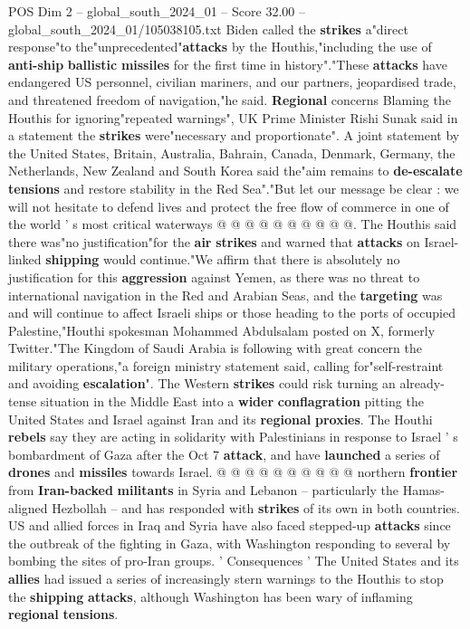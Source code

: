 \begin{textsample}{POS Dim 2 – global\_south\_2024\_01 – Score 32.00 – global\_south\_2024\_01/105038105.txt}
Biden called the \textbf{strikes} a"direct response"to the"unprecedented"\textbf{attacks} by the Houthis,"including the use of \textbf{anti-ship} \textbf{ballistic} \textbf{missiles} for the first time in history"."These \textbf{attacks} have endangered US personnel, civilian mariners, and our partners, jeopardised trade, and threatened freedom of navigation,"he said. \textbf{Regional} concerns Blaming the Houthis for ignoring"repeated warnings", UK Prime Minister Rishi Sunak said in a statement the \textbf{strikes} were"necessary and proportionate".
A joint statement by the United States, Britain, Australia, Bahrain, Canada, Denmark, Germany, the Netherlands, New Zealand and South Korea said the"aim remains to \textbf{de-escalate} \textbf{tensions} and restore stability in the Red Sea"."But let our message be clear : we will not hesitate to defend lives and protect the free flow of commerce in one of the world ' s most critical waterways @ @ @ @ @ @ @ @ @ @.
The Houthis said there was"no justification"for the \textbf{air} \textbf{strikes} and warned that \textbf{attacks} on Israel-linked \textbf{shipping} would continue."We affirm that there is absolutely no justification for this \textbf{aggression} against Yemen, as there was no threat to international navigation in the Red and Arabian Seas, and the \textbf{targeting} was and will continue to affect Israeli ships or those heading to the ports of occupied Palestine,"Houthi spokesman Mohammed Abdulsalam posted on X, formerly Twitter."The Kingdom of Saudi Arabia is following with great concern the military operations,"a foreign ministry statement said, calling for"self-restraint and avoiding \textbf{escalation}".
The Western \textbf{strikes} could risk turning an already-tense situation in the Middle East into a \textbf{wider} \textbf{conflagration} pitting the United States and Israel against Iran and its \textbf{regional} \textbf{proxies}.
The Houthi \textbf{rebels} say they are acting in solidarity with Palestinians in response to Israel ' s bombardment of Gaza after the Oct 7 \textbf{attack}, and have \textbf{launched} a series of \textbf{drones} and \textbf{missiles} towards Israel. @ @ @ @ @ @ @ @ @ @ northern \textbf{frontier} from \textbf{Iran-backed} \textbf{militants} in Syria and Lebanon -- particularly the Hamas-aligned Hezbollah -- and has responded with \textbf{strikes} of its own in both countries.
US and allied forces in Iraq and Syria have also faced stepped-up \textbf{attacks} since the outbreak of the fighting in Gaza, with Washington responding to several by bombing the sites of pro-Iran groups. ' Consequences ' The United States and its \textbf{allies} had issued a series of increasingly stern warnings to the Houthis to stop the \textbf{shipping} \textbf{attacks}, although Washington has been wary of inflaming \textbf{regional} \textbf{tensions}.

\end{textsample}
